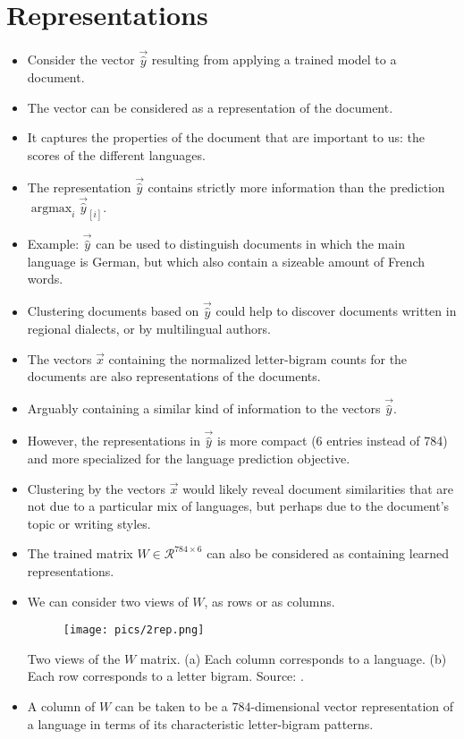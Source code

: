 \section{Representations}
\begin{itemize}
\item Consider the vector $\vec{\hat{y}}$  resulting from applying a trained model to a document.
\item The vector can be considered as a representation of the document.
\item It captures the properties of the document that are important to us:  the scores of the different languages.
\item The representation $\vec{\hat{y}}$  contains strictly more information than the prediction $\operatorname{argmax}_i \vec{\hat{y}}_{[i]} $.
\item Example: $\vec{\hat{y}}$ can be used to distinguish documents in which the main language is German, but which also contain a sizeable amount of French words.
\item Clustering documents based on $\vec{\hat{y}}$ could help to discover documents written in regional dialects, or by multilingual authors.
\item The vectors $\vec{x}$ containing the normalized letter-bigram counts for the documents are also representations of the documents.
\item Arguably containing a similar kind of information to the vectors $\vec{\hat{y}}$. 
\item However, the representations in  $\vec{\hat{y}}$ is more compact (6 entries instead of 784) and more specialized for the language prediction objective.
\item Clustering by the vectors $\vec{x}$ would likely reveal document similarities that are not due to a particular mix of languages, but perhaps due to the document's topic or writing styles.
\item The trained matrix $W \in \mathcal{R}^{784 \times 6}$  can also be considered as containing learned representations.
\item We can consider two views of $W$, as rows or as columns.
\begin{figure}[htb]
	\centering
	 \texttt{[image: pics/2rep.png]}
\end{figure}
Two views of the $W$ matrix. (a) Each column corresponds to a language. (b) Each row
corresponds to a letter bigram. Source: \cite{goldberg2017neural}.
\item A column of $W$ can be taken to be a $784$-dimensional vector representation of a language in terms of its characteristic letter-bigram patterns.

\end{itemize}
